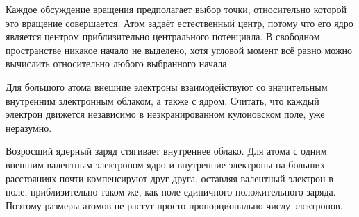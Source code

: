Каждое обсуждение вращения предполагает выбор точки, относительно которой это вращение совершается. Атом задаёт естественный центр, потому что его ядро является центром приблизительно центрального потенциала. В свободном пространстве никакое начало не выделено, хотя угловой момент всё равно можно вычислить относительно любого выбранного начала.

\begin{classroomqa}
\end{classroomqa}

Для большого атома внешние электроны взаимодействуют со значительным внутренним электронным облаком, а также с ядром. Считать, что каждый электрон движется независимо в неэкранированном кулоновском поле, уже неразумно.

\begin{classroomqa}
\end{classroomqa}

Возросший ядерный заряд стягивает внутреннее облако. Для атома с одним внешним валентным электроном ядро и внутренние электроны на больших расстояниях почти компенсируют друг друга, оставляя валентный электрон в поле, приблизительно таком же, как поле единичного положительного заряда. Поэтому размеры атомов не растут просто пропорционально числу электронов.

\begin{classroomqa}
\end{classroomqa}

